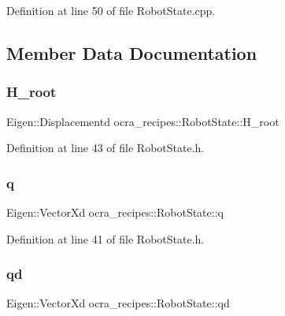 Definition at line 50 of file Robot\+State.\+cpp.



\subsection{Member Data Documentation}
\hypertarget{classocra__recipes_1_1RobotState_a296aaf0b3131a7d2c2a82b3b8a4cc583}{}\label{classocra__recipes_1_1RobotState_a296aaf0b3131a7d2c2a82b3b8a4cc583} 
\subsubsection{\texorpdfstring{H\+\_\+root}{H\_root}}
{\footnotesize\ttfamily Eigen\+::\+Displacementd ocra\+\_\+recipes\+::\+Robot\+State\+::\+H\+\_\+root}



Definition at line 43 of file Robot\+State.\+h.

\hypertarget{classocra__recipes_1_1RobotState_aa442f30f43e33d4c5f5d007640d8aaa0}{}\label{classocra__recipes_1_1RobotState_aa442f30f43e33d4c5f5d007640d8aaa0} 
\subsubsection{\texorpdfstring{q}{q}}
{\footnotesize\ttfamily Eigen\+::\+Vector\+Xd ocra\+\_\+recipes\+::\+Robot\+State\+::q}



Definition at line 41 of file Robot\+State.\+h.

\hypertarget{classocra__recipes_1_1RobotState_ac45331562cde3f3f67a9f40d71e47c6a}{}\label{classocra__recipes_1_1RobotState_ac45331562cde3f3f67a9f40d71e47c6a} 
\subsubsection{\texorpdfstring{qd}{qd}}
{\footnotesize\ttfamily Eigen\+::\+Vector\+Xd ocra\+\_\+recipes\+::\+Robot\+State\+::qd}



